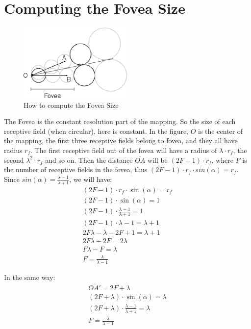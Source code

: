 \documentclass{article}
\begin{document}
\section{Computing the Fovea Size}
\label{sec:ComputingTheFoveaSize}
	
\begin{figure}[htbp]
	\centering
		\includegraphics[width=0.50\textwidth]{Image2.eps}
	\caption{How to compute the Fovea Size}
	\label{fig:Image2}
\end{figure}

The Fovea is the constant resolution part of the mapping. So the size of each receptive field (when circular), here is constant. In the figure, $O$ is the center of the mapping, the first three receptive fields belong to fovea, and they all have radius $r_{f}$. The first receptive field out of the fovea will have a radius of $\lambda\cdot r_{f}$, the second $\lambda^{2}\cdot r_{f}$ and so on. Then the distance $\overline{OA}$ will be $(2F-1)\cdot r_{f}$, where $F$ is the number of receptive fields in the fovea, thus $(2F-1)\cdot r_{f}\cdot sin(\alpha)=r_{f}$. Since $sin(\alpha)=\frac{\lambda-1}{\lambda+1}$, we will have:
\begin{eqnarray}
	(2F-1)\cdot r_{f}\cdot \sin(\alpha)=r_{f}\\
	(2F-1)\cdot \sin(\alpha)=1\\
	(2F-1)\cdot \frac{\lambda-1}{\lambda+1}=1\\
	(2F-1)\cdot \lambda-1=\lambda+1\\
	2F\lambda-\lambda-2F+1=\lambda+1\\
	2F\lambda-2F=2\lambda\\
	F\lambda-F=\lambda\\
	F=\frac{\lambda}{\lambda-1}
\end{eqnarray}

In the same way:
\begin{eqnarray}
	\overline{OA'}=2F+\lambda\\
	(2F+\lambda)\cdot \sin(\alpha)=\lambda\\
	(2F+\lambda)\cdot \frac{\lambda-1}{\lambda+1}=\lambda\\
	F=\frac{\lambda}{\lambda-1}
\end{eqnarray}
\end{document}
